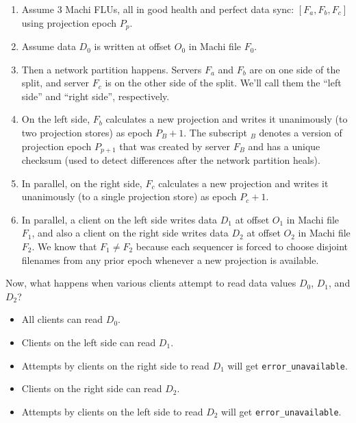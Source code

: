 \documentclass[preprint,10pt]{sigplanconf}
\begin{document}
\begin{enumerate}

\item Assume 3 Machi FLUs, all in good health and perfect data sync: $[F_a,
  F_b, F_c]$ using projection epoch $P_p$.

\item Assume data $D_0$ is written at offset $O_0$ in Machi file
  $F_0$.

\item Then a network partition happens.  Servers $F_a$ and $F_b$ are
  on one side of the split, and server $F_c$ is on the other side of
  the split.  We'll call them the ``left side'' and ``right side'',
  respectively.

\item On the left side, $F_b$ calculates a new projection and writes
  it unanimously (to two projection stores) as epoch $P_B+1$.  The
  subscript $_B$ denotes a
  version of projection epoch $P_{p+1}$ that was created by server $F_B$
  and has a unique checksum (used to detect differences after the
  network partition heals).

\item In parallel, on the right side, $F_c$ calculates a new
  projection and writes it unanimously (to a single projection store)
  as epoch $P_c+1$.

\item In parallel, a client on the left side writes data $D_1$
  at offset $O_1$ in Machi file $F_1$, and also
  a client on the right side writes data $D_2$
  at offset $O_2$ in Machi file $F_2$.  We know that $F_1 \ne F_2$
  because each sequencer is forced to choose disjoint filenames from
  any prior epoch whenever a new projection is available.

\end{enumerate}

Now, what happens when various clients attempt to read data values
$D_0$, $D_1$, and $D_2$?

\begin{itemize}
\item All clients can read $D_0$.
\item Clients on the left side can read $D_1$.
\item Attempts by clients on the right side to read $D_1$ will get
  {\tt error\_unavailable}.
\item Clients on the right side can read $D_2$.
\item Attempts by clients on the left side to read $D_2$ will get
  {\tt error\_unavailable}.
\end{itemize}
\end{document}
